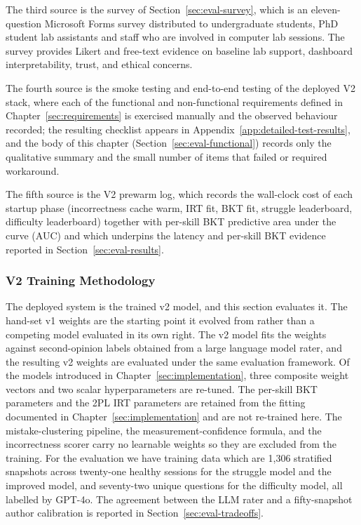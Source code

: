 The third source is the survey of Section~\ref{sec:eval-survey}, which is an eleven-question Microsoft Forms survey distributed to undergraduate students, PhD student lab assistants and staff who are involved in computer lab sessions.
The survey provides Likert and free-text evidence on baseline lab support, dashboard interpretability, trust, and ethical concerns. 

The fourth source is the smoke testing and end-to-end testing of the deployed V2 stack, where each of the functional and non-functional requirements defined in Chapter~\ref{sec:requirements} is exercised manually and the observed behaviour recorded; the resulting checklist appears in Appendix~\ref{app:detailed-test-results}, and the body of this chapter (Section~\ref{sec:eval-functional}) records only the qualitative summary and the small number of items that failed or required workaround.

The fifth source is the V2 prewarm log, which records the wall-clock cost of each startup phase (incorrectness cache warm, IRT fit, BKT fit, struggle leaderboard, difficulty leaderboard) together with per-skill BKT predictive area under the curve (AUC) and which underpins the latency and per-skill BKT evidence reported in Section~\ref{sec:eval-results}.



\subsubsection{V2 Training Methodology} \label{sec:eval-v2-methodology}

The deployed system is the trained v2 model, and this section evaluates it. The hand-set v1 weights are the starting point it evolved from rather than a competing model evaluated in its own right.
The v2 model fits the weights against second-opinion labels obtained from a large language model rater, and the resulting v2 weights are evaluated under the same evaluation framework.
Of the models introduced in Chapter~\ref{sec:implementation}, three composite weight vectors and two scalar hyperparameters are re-tuned.
The per-skill BKT parameters and the 2PL IRT parameters are retained from the fitting documented in Chapter~\ref{sec:implementation} and are not re-trained here.
The mistake-clustering pipeline, the measurement-confidence formula, and the incorrectness scorer carry no learnable weights so they are excluded from the training. 
For the evaluation we have training data which are 1{,}306 stratified snapshots across twenty-one healthy sessions for the struggle model and the improved model, and seventy-two unique questions for the difficulty model, all labelled by GPT-4o. 
The agreement between the LLM rater and a fifty-snapshot author calibration is reported in Section~\ref{sec:eval-tradeoffs}.


